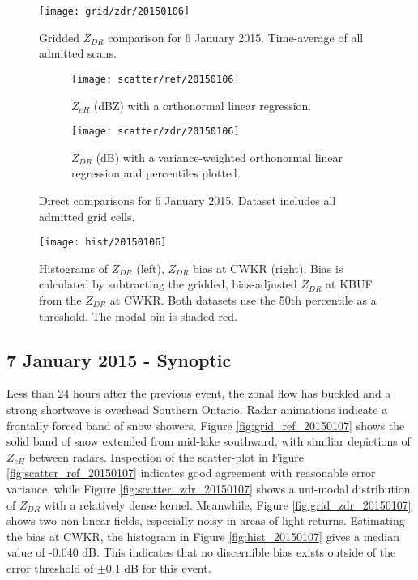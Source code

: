 \begin{figure}[H]
\texttt{[image: grid/zdr/20150106]}
\caption{Gridded $Z_{DR}$ comparison for 6 January 2015. Time-average of all admitted scans.} 
\label{fig:grid_zdr_20150106}
\end{figure}

\begin{figure}[H]
\centering
   \begin{subfigure}[t]{0.48\linewidth} \centering
     \texttt{[image: scatter/ref/20150106]}
     \caption{$Z_{eH}$ (dBZ) with a orthonormal linear regression.}\label{fig:scatter_ref_20150106}
   \end{subfigure}
   \begin{subfigure}[t]{0.48\linewidth} \centering
     \texttt{[image: scatter/zdr/20150106]}
     \caption{$Z_{DR}$ (dB) with a variance-weighted orthonormal linear regression and percentiles plotted.}\label{fig:scatter_zdr_20150106}
   \end{subfigure}
\caption{Direct comparisons for 6 January 2015. Dataset includes all admitted grid cells.} \label{fig:scatter_20150106}
\end{figure}

\begin{figure}[H]
\texttt{[image: hist/20150106]}\centering
\caption{Histograms of $Z_{DR}$ (left), $Z_{DR}$ bias at CWKR (right). Bias is calculated by subtracting the gridded, bias-adjusted $Z_{DR}$ at KBUF from the
$Z_{DR}$ at CWKR. Both datasets use the 50th percentile as a threshold. The modal bin is shaded red.} 
\label{fig:hist_20150106}
\end{figure}

\subsection{7 January 2015 - Synoptic}
Less than 24 hours after the previous event, the zonal flow has buckled and a strong shortwave is overhead Southern Ontario. Radar animations indicate a
frontally forced band of snow showers. Figure \ref{fig:grid_ref_20150107} shows the solid band of snow extended from mid-lake southward, with similiar
depictions of $Z_{eH}$ between radars. Inspection of the scatter-plot in Figure \ref{fig:scatter_ref_20150107} indicates good agreement with reasonable error
variance, while Figure \ref{fig:scatter_zdr_20150107} shows a uni-modal distribution of $Z_{DR}$ with a relatively dense kernel.
Meanwhile, Figure \ref{fig:grid_zdr_20150107} shows two non-linear fields, especially noisy in areas of light returns. 
Estimating the bias at CWKR, the histogram in Figure \ref{fig:hist_20150107} gives a median value of -0.040 dB. This indicates that no discernible bias
exists outside of the error threshold of $\pm$0.1 dB for this event.

